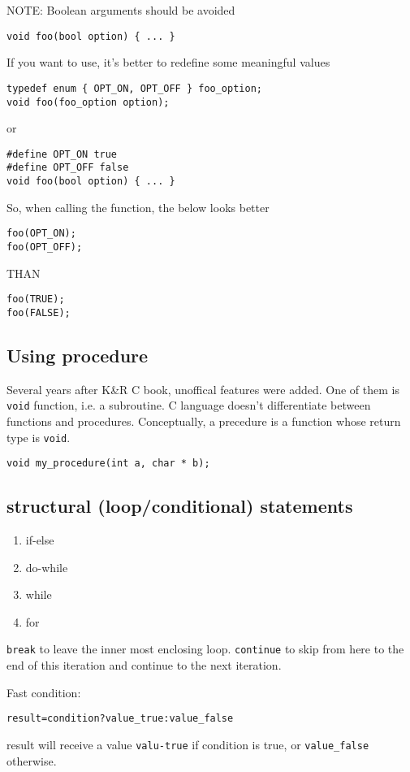 NOTE: Boolean arguments should be avoided
\begin{lstlisting}
void foo(bool option) { ... }
\end{lstlisting}
If you want to use, it's better to redefine some meaningful values
\begin{lstlisting}
typedef enum { OPT_ON, OPT_OFF } foo_option;
void foo(foo_option option);
\end{lstlisting}
or
\begin{lstlisting}
#define OPT_ON true
#define OPT_OFF false
void foo(bool option) { ... }
\end{lstlisting}
So, when calling the function, the below looks better
\begin{lstlisting}
foo(OPT_ON);
foo(OPT_OFF);
\end{lstlisting}
THAN
\begin{lstlisting}
foo(TRUE);
foo(FALSE);
\end{lstlisting}

\subsection{Using procedure}

Several years after K\&R C book, unoffical features were added. One of them is
\verb!void! function, i.e. a subroutine. C language doesn't differentiate
between functions and procedures. Conceptually, a precedure is a function whose
return type is \verb!void!.

\begin{lstlisting}
void my_procedure(int a, char * b);
\end{lstlisting}

\subsection{structural (loop/conditional) statements}

\begin{enumerate}
  \item if-else
  \item do-while
  \item while
  \item for
\end{enumerate}
\verb!break! to leave the inner most enclosing loop. \verb!continue! to
skip from here to the end of this iteration and continue to the next iteration.

Fast condition:
\begin{lstlisting}
result=condition?value_true:value_false
\end{lstlisting}
result will receive a value \verb!valu-true! if condition is true, or
\verb!value_false! otherwise.



